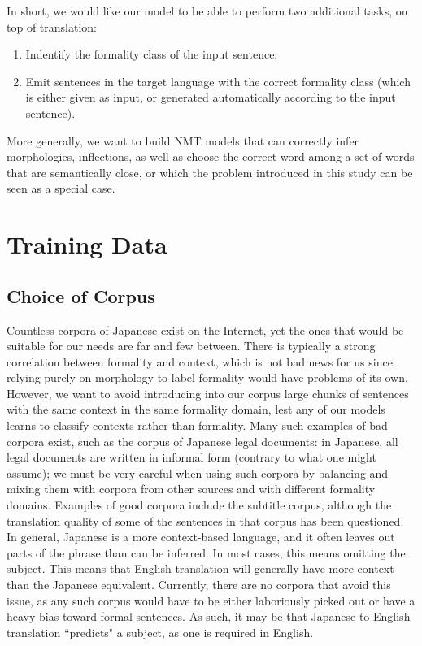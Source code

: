 \documentclass[11pt]{article}
\begin{document}
In short, we would like our model to be able to perform two additional tasks, on top of translation:

\begin{enumerate}[label=\arabic*]
    \item Indentify the formality class of the input sentence;
    \item Emit sentences in the target language with the correct formality class (which is either given as input, or generated automatically according to the input sentence).
\end{enumerate}

More generally, we want to build NMT models that can correctly infer morphologies, inflections, as well as choose the correct word among a set of words that are semantically close, or which the problem introduced in this study can be seen as a special case.

\section{Training Data}

\subsection{Choice of Corpus}

Countless corpora of Japanese exist on the Internet, yet the ones that would be suitable for our needs are far and few between. There is typically a strong correlation between formality and context, which is not bad news for us since relying purely on morphology to label formality would have problems of its own. However, we want to avoid introducing into our corpus large chunks of sentences with the same context in the same formality domain, lest any of our models learns to classify contexts rather than formality. Many such examples of bad corpora exist, such as the corpus of Japanese legal documents: in Japanese, all legal documents are written in informal form (contrary to what one might assume); we must be very careful when using such corpora by balancing and mixing them with corpora from other sources and with different formality domains. Examples of good corpora include the subtitle corpus, although the translation quality of some of the sentences in that corpus has been questioned. In general, Japanese is a more context-based language, and it often leaves out parts of the phrase than can be inferred. In most cases, this means omitting the subject. This means that English translation will generally have more context than the Japanese equivalent. Currently, there are no corpora that avoid this issue, as any such corpus would have to be either laboriously picked out or have a heavy bias toward formal sentences. As such, it may be that Japanese to English translation ``predicts" a subject, as one is required in English. 
\end{document}
